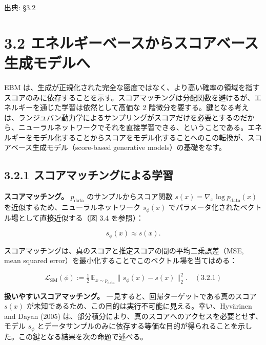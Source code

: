 

{\color{gray}\footnotesize 出典: §3.2\par}
\vspace{0.2em}
\section*{3.2 エネルギーベースからスコアベース生成モデルへ}



EBM は、生成が正規化された完全な密度ではなく、より高い確率の領域を指すスコアのみに依存することを示す。スコアマッチングは分配関数を避けるが、エネルギーを通じた学習は依然として高価な 2 階微分を要する。鍵となる考えは、ランジュバン動力学によるサンプリングがスコアだけを必要とするのだから、ニューラルネットワークでそれを直接学習できる、ということである。エネルギーをモデル化することからスコアをモデル化することへのこの転換が、スコアベース生成モデル（score-based generative models）の基礎をなす。



\subsection*{3.2.1 スコアマッチングによる学習}


\textbf{スコアマッチング。} $p_{\mathrm{data}}$ のサンプルからスコア関数 $s(x)=\nabla_x\log p_{\mathrm{data}}(x)$ を近似するため、ニューラルネットワーク $s_\phi(x)$ でパラメータ化されたベクトル場として直接近似する（図 3.4 を参照）：

\[
s_\phi(x) \approx s(x).
\]


スコアマッチングは、真のスコアと推定スコアの間の平均二乗誤差（MSE, mean squared error）を最小化することでこのベクトル場を当てはめる：

\[
\mathcal{L}_{\mathrm{SM}}(\phi) := \tfrac{1}{2}\,\mathbb{E}_{x\sim p_{\mathrm{data}}}\bigl\|s_\phi(x) - s(x)\bigr\|_2^2.\quad (3.2.1)
\]


\textbf{扱いやすいスコアマッチング。} 一見すると、回帰ターゲットである真のスコア $s(x)$ が未知であるため、この目的は実行不可能に見える。幸い、Hyvärinen and Dayan (2005) は、部分積分により、真のスコアへのアクセスを必要とせず、モデル $s_\phi$ とデータサンプルのみに依存する等価な目的が得られることを示した。この鍵となる結果を次の命題で述べる。

